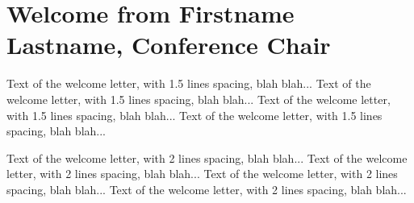 \section*{Welcome from Firstname Lastname, Conference Chair}
\vspace*{1.1cm}
\onehalfspace
\begin{center}
  \begin{minipage}[h]{14cm}
    Text of the welcome letter, with 1.5 lines spacing, blah blah...
    Text of the welcome letter, with 1.5 lines spacing, blah blah...
    Text of the welcome letter, with 1.5 lines spacing, blah blah...
    Text of the welcome letter, with 1.5 lines spacing, blah blah...
  \end{minipage}
\end{center}
\doublespace
\begin{center}
  \begin{minipage}[h]{14cm}
    Text of the welcome letter, with 2 lines spacing, blah blah...
    Text of the welcome letter, with 2 lines spacing, blah blah...
    Text of the welcome letter, with 2 lines spacing, blah blah...
    Text of the welcome letter, with 2 lines spacing, blah blah...
  \end{minipage}
\end{center}
\singlespace
\tableofcontents

\mainmatter
\mainmattertocstyle


\backmatter
\backmattertocstyle

{\footnotesize}
\insertindex

